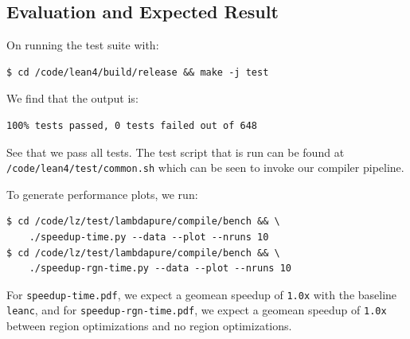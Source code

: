 \documentclass[conference]{IEEEtran}
\begin{document}
{%
%
%
%
%
%

\subsection{Evaluation and Expected Result}
On running the test suite with:

\begin{verbatim}
$ cd /code/lean4/build/release && make -j test
\end{verbatim}

We find that the output is:

\begin{verbatim}
100% tests passed, 0 tests failed out of 648
\end{verbatim}


See that we pass all tests. The test script that is run can be found at
\texttt{/code/lean4/test/common.sh} which can be seen to invoke our compiler
pipeline.


To generate performance plots, we run:

\begin{verbatim}
$ cd /code/lz/test/lambdapure/compile/bench && \
    ./speedup-time.py --data --plot --nruns 10
$ cd /code/lz/test/lambdapure/compile/bench && \
    ./speedup-rgn-time.py --data --plot --nruns 10
\end{verbatim}

For \texttt{speedup-time.pdf}, we expect a geomean speedup of \texttt{1.0x} with the
baseline \texttt{leanc}, and for \texttt{speedup-rgn-time.pdf}, we expect a geomean speedup of \texttt{1.0x} between region
optimizations and no region optimizations.


}
\end{document}
